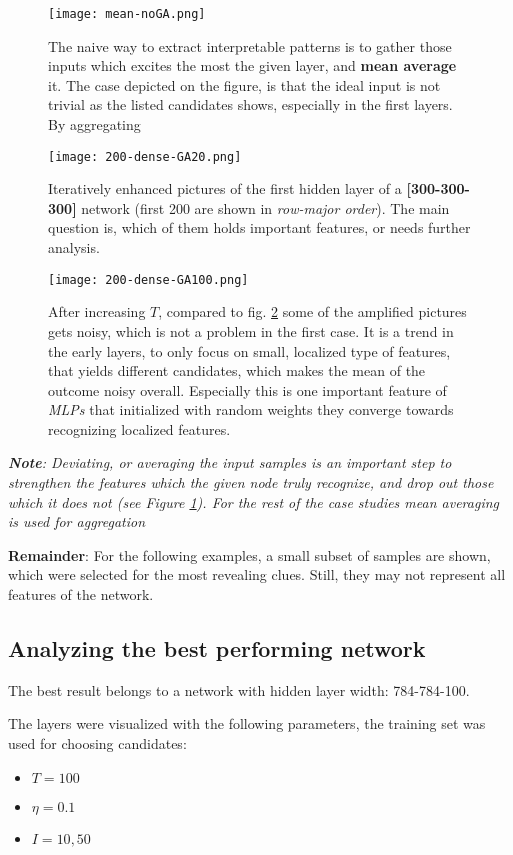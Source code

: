 \begin{figure}
    \centering
    \texttt{[image: mean-noGA.png]}
    \caption{The naive way to extract interpretable patterns is to gather those inputs which excites the most the given layer, and \textbf{mean average} it. The case depicted on the figure, is that the ideal input is not trivial as the listed candidates shows, especially in the first layers. By aggregating}
    \label{fig:mean}
\end{figure}


\begin{figure}
    \centering
    \texttt{[image: 200-dense-GA20.png]}
    \caption{Iteratively enhanced pictures of the first hidden layer of a \textbf{[300-300-300]} network (first 200 are shown in \emph{row-major order}). The main question is, which of them holds important features, or needs further analysis.}
    \label{fig:dense}
\end{figure}


\begin{figure}
    \centering
    \texttt{[image: 200-dense-GA100.png]}
    \caption{After increasing $T$, compared to fig. \ref{fig:dense} some of the amplified pictures gets noisy, which is not a problem in the first case. It is a trend in the early layers, to only focus on small, localized type of features, that yields different candidates, which makes the mean of the outcome noisy overall. Especially this is one important feature of \emph{MLPs} that initialized with random weights they converge towards recognizing localized features.}
    \label{fig:dense-100}
\end{figure}


\emph{\textbf{Note}: Deviating, or averaging the input samples is an important step to strengthen the features which the given node truly recognize, and drop out those which it does not (see Figure \ref{fig:mean}). For the rest of the case studies mean averaging is used for aggregation}

\textbf{Remainder}: For the following examples, a small subset of samples are shown, which were selected for the most revealing clues. Still, they may not represent all features of the network.


\subsection{Analyzing the best performing network}
The best result belongs to a network with hidden layer width: 784-784-100. 

The layers were visualized with the following parameters, the training set was used for choosing candidates:
\begin{itemize}
    \item[] $T=100$
    \item[] $\eta=0.1$
    \item[] $I=10, 50$
\end{itemize}